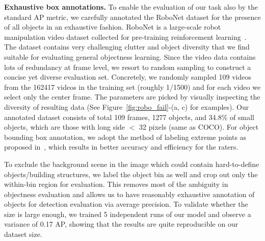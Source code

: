 \documentclass[10pt,twocolumn,letterpaper]{article}
\newcommand{\figureref}[1]{Figure~\ref{#1}}
\renewcommand{\paragraph}[1]{\vspace{1mm}\noindent\textbf{#1}}
\begin{document}
\paragraph{Exhaustive box annotations.} \quad
To enable the evaluation of our task also by the standard AP metric, we carefully annotated the RoboNet dataset for the presence of all objects in an exhaustive fashion. RoboNet is a large-scale robot manipulation video dataset collected for pre-training reinforcement learning~\cite{dasari2019robonet}. The dataset contains very challenging clutter and object diversity that we find suitable for evaluating general objectness learning. Since the video data contains lots of redundancy at frame level, we resort to random sampling to construct a concise yet diverse evaluation set. Concretely, we randomly sampled 109 videos from the 162417 videos in the training set (roughly 1/1500) and for each video we select only the center frame. The parameters are picked by visually inspecting the diversity of resulting data (See \figureref{fig:robo_fail}-(a, c) for examples). Our annotated dataset consists of total 109 frames, 1277 objects, and 34.8\% of small objects, which are those with long side $<$ 32 pixels (same as COCO). For object bounding box annotation, we adopt the method of labeling extreme points as proposed in~\cite{kuznetsova2018open}, which results in better accuracy and efficiency for the raters.

To exclude the background scene in the image which could contain hard-to-define objects/building structures, we label the object bin as well and crop out only the within-bin region for evaluation. This removes most of the ambiguity in objectness evaluation and allows us to have reasonably exhaustive annotation of objects for detection evaluation via average precision. To validate whether the size is large enough, we trained 5 independent runs of our model and observe a variance of 0.17 AP, showing that the results are quite reproducible on our dataset size.
\end{document}
